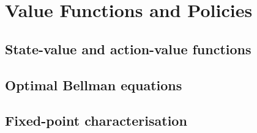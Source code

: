 
\section{Value Functions and Policies}

\subsection{State-value and action-value functions}


\subsection{Optimal Bellman equations}


\subsection{Fixed-point characterisation}

